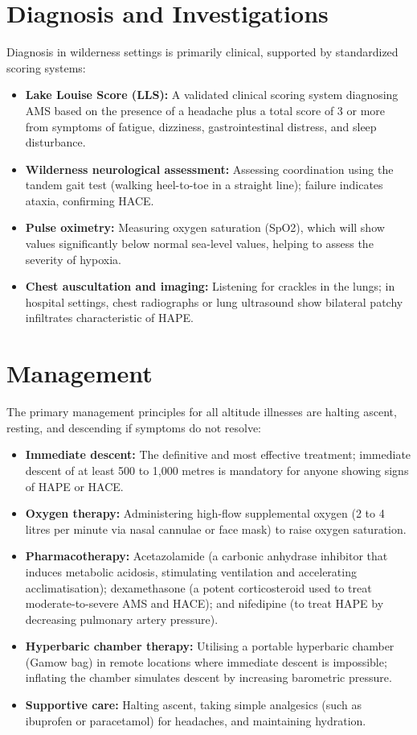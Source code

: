 \section*{Diagnosis and Investigations}
Diagnosis in wilderness settings is primarily clinical, supported by standardized scoring systems:
\begin{itemize}
    \item \textbf{Lake Louise Score (LLS):} A validated clinical scoring system diagnosing AMS based on the presence of a headache plus a total score of 3 or more from symptoms of fatigue, dizziness, gastrointestinal distress, and sleep disturbance.
    \item \textbf{Wilderness neurological assessment:} Assessing coordination using the tandem gait test (walking heel-to-toe in a straight line); failure indicates ataxia, confirming HACE.
    \item \textbf{Pulse oximetry:} Measuring oxygen saturation (SpO2), which will show values significantly below normal sea-level values, helping to assess the severity of hypoxia.
    \item \textbf{Chest auscultation and imaging:} Listening for crackles in the lungs; in hospital settings, chest radiographs or lung ultrasound show bilateral patchy infiltrates characteristic of HAPE.
\end{itemize}

\section*{Management}
The primary management principles for all altitude illnesses are halting ascent, resting, and descending if symptoms do not resolve:
\begin{itemize}
    \item \textbf{Immediate descent:} The definitive and most effective treatment; immediate descent of at least 500 to 1,000 metres is mandatory for anyone showing signs of HAPE or HACE.
    \item \textbf{Oxygen therapy:} Administering high-flow supplemental oxygen (2 to 4 litres per minute via nasal cannulae or face mask) to raise oxygen saturation.
    \item \textbf{Pharmacotherapy:} Acetazolamide (a carbonic anhydrase inhibitor that induces metabolic acidosis, stimulating ventilation and accelerating acclimatisation); dexamethasone (a potent corticosteroid used to treat moderate-to-severe AMS and HACE); and nifedipine (to treat HAPE by decreasing pulmonary artery pressure).
    \item \textbf{Hyperbaric chamber therapy:} Utilising a portable hyperbaric chamber (Gamow bag) in remote locations where immediate descent is impossible; inflating the chamber simulates descent by increasing barometric pressure.
    \item \textbf{Supportive care:} Halting ascent, taking simple analgesics (such as ibuprofen or paracetamol) for headaches, and maintaining hydration.
\end{itemize}

